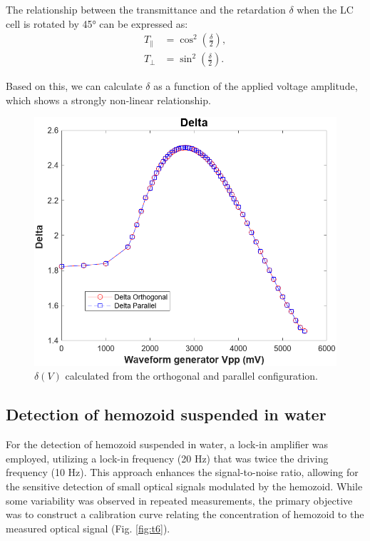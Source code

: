 \documentclass[12pt,a4paper]{article}
\begin{document}

The relationship between the transmittance and the retardation $\delta$ when the LC cell is rotated by 45° can be expressed as:
\begin{align*}
T_\parallel &= \cos^2\!\left(\frac{\delta}{2}\right),\\
T_\perp      &= \sin^2\!\left(\frac{\delta}{2}\right).
\end{align*}

Based on this, we can calculate $\delta$ as a function of the applied voltage amplitude, which shows a strongly non-linear relationship.

\begin{figure} [H]
    \centering
    \includegraphics[width=0.6\linewidth]{figs/task34_delta.png}
    \caption{$\delta(V)$ calculated from the orthogonal and parallel configuration.}
    \label{fig:t3_4_delta}
\end{figure}

\subsection{Detection of hemozoid suspended in water}
For the detection of hemozoid suspended in water, a lock-in amplifier was employed, utilizing a lock-in frequency (20 Hz) that was twice the driving frequency (10 Hz). This approach enhances the signal-to-noise ratio, allowing for the sensitive detection of small optical signals modulated by the hemozoid. While some variability was observed in repeated measurements, the primary objective was to construct a calibration curve relating the concentration of hemozoid to the measured optical signal (Fig. \ref{fig:t6}).
\end{document}
